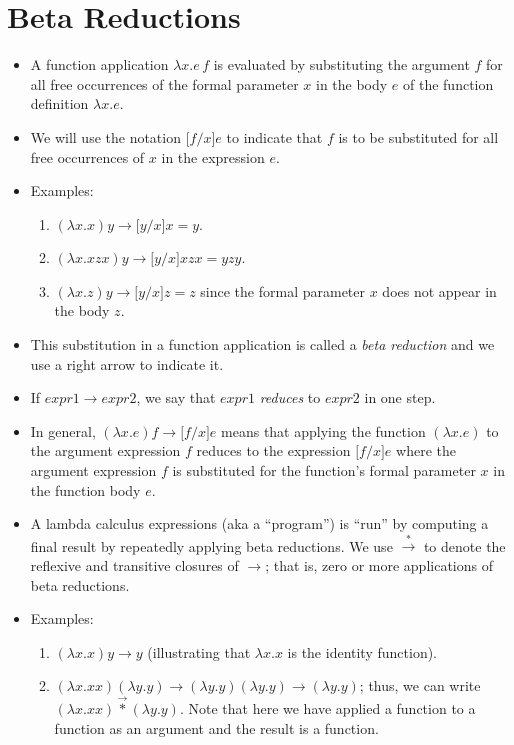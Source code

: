 \documentclass[]{article}
\begin{document}
\section{Beta Reductions}
\begin{itemize}
\item A function application $\lambda x.e\,f$ is evaluated by substituting the
argument $f$ for all free occurrences of the formal parameter $x$ in the body
$e$ of the function definition $\lambda x.e$.
\item We will use the notation $\lbrack f/x\rbrack e$ to indicate that $f$ is to
be substituted for all free occurrences of $x$ in the expression $e$.
\item Examples:
\begin{enumerate}
\item $(\lambda x.x)y \rightarrow \lbrack y/x \rbrack x = y$.
\item $(\lambda x.xzx)y \rightarrow \lbrack y/x \rbrack xzx = yzy$.
\item $(\lambda x.z)y \rightarrow \lbrack y/x \rbrack z = z$ since the formal
parameter $x$ does not appear in the body $z$.
\end{enumerate}
\item This substitution in a function application is called a \emph{beta
reduction} and we use a right arrow to indicate it.
\item If $expr1 \rightarrow expr2$, we say that $expr1$ \emph{reduces} to
$expr2$ in one step.
\item In general, $(\lambda x.e)f \rightarrow \lbrack f/x \rbrack e$ means that
applying the function $(\lambda x.e)$ to the argument expression $f$ reduces to
the expression $\lbrack f/x \rbrack e$ where the argument expression $f$ is
substituted for the function's formal parameter $x$ in the function body $e$.
\item A lambda calculus expressions (aka a ``program'') is ``run'' by computing
a final result by repeatedly applying beta reductions. We use
$\overset{*}{\rightarrow}$ to denote the reflexive and transitive closures of
$\rightarrow$; that is, zero or more applications of beta reductions.
\item Examples:
\begin{enumerate}
\item $(\lambda x.x)y \rightarrow y$ (illustrating that $\lambda x.x$ is the
identity function).
\item $(\lambda x.xx)(\lambda y.y) \rightarrow (\lambda y.y)(\lambda y.y)
\rightarrow (\lambda y.y)$; thus, we can write $(\lambda
x.xx)\overset{\rightarrow}{*}(\lambda y.y)$. Note that here we have applied a
function to a function as an argument and the result is a function.
\end{enumerate}
\end{itemize}
\end{document}

